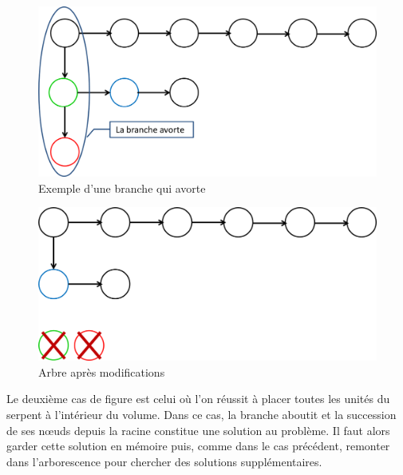 \begin{figure}[h]
 \centering
 \includegraphics[scale=0.3,keepaspectratio=true]{img/pathAbort.png}
 \caption{Exemple d'une branche qui avorte}
 \label{pathAbort}
\end{figure}

\newpage

\begin{figure}[h]
 \centering
 \includegraphics[scale=0.3,keepaspectratio=true]{img/pathAfter.png}
 \caption{Arbre après modifications}
 \label{pathAfter}
\end{figure}

Le deuxième cas de figure est celui où l’on réussit à placer toutes les unités du serpent à l’intérieur du volume. Dans ce cas, la branche aboutit et la succession de ses nœuds depuis la racine constitue une solution au problème. Il faut alors garder cette solution en mémoire puis, comme dans le cas précédent, remonter dans l’arborescence pour chercher des solutions supplémentaires. 

